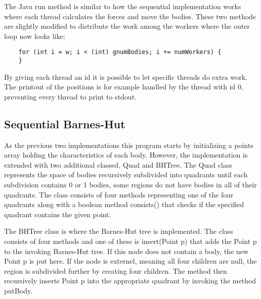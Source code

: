 \documentclass{article}
\begin{document}
The Java run method is similar to how the sequential implementation works where each thread calculates the forces and move the bodies. These two methods are slightly modified to distribute the work among the workers where the outer loop now looks like: \begin{verbatim}
    for (int i = w; i < (int) gnumBodies; i += numWorkers) {
    }
\end{verbatim}{}

By giving each thread an id it is possible to let specific threads do extra work. The printout of the positions is for example handled by the thread with id 0, preventing every thread to print to stdout. 

\subsection{Sequential Barnes-Hut}

As the previous two implementations this program starts by initializing a points array holding the characteristics of each body. However, the implementation is extended with two additional classed, Quad and BHTree. The Quad class represents the space of bodies recursively subdivided into quadrants until each subdivision contains 0 or 1 bodies, some regions do not have bodies in all of their quadrants. The class consists of four methods representing one of the four quadrants along with a boolean method consists() that checks if the specified quadrant contains the given point.  

The BHTree class is where the Barnes-Hut tree is implemented. The class consists of four methods and one of these is insert(Point p) that adds the Point p to the invoking Barnes-Hut tree. If this node does not contain a body, the new Point p is put here. If the node is externel, meaning all four children are null, the region is subdivided further by creating four children. The method then recursively inserts Point p into the appropriate quadrant by invoking the method putBody.
\end{document}
